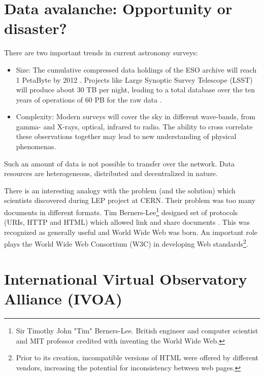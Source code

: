 \section{ Data avalanche: Opportunity or disaster?}

There are two important trends in current astronomy surveys:

\begin{itemize}

  \item{Size:} The cumulative compressed data holdings of the ESO archive will
    reach 1 PetaByte by 2012 \citep{hanisch2010international}. Projects
    like Large Synoptic Survey Telescope (LSST) will produce about 30
    TB per night, leading to a total database over the ten years of
    operations of 60 PB for the raw data \citep{becla2006designing}.
   
  \item{Complexity:} Modern surveys will cover the sky in different
    wave-bands, from gamma- and X-rays, optical, infrared to
    radio. The ability to cross correlate these observations together
    may lead to new understanding of physical
    phenomenas. \citep{hanisch2010international}
\end{itemize}



Such an amount of data is not possible to transfer over the
network. Data resources are heterogeneous, distributed and
decentralized in nature.


There is an interesting analogy with the problem (and the solution)
which scientists discovered during LEP project at CERN.  Their problem
was too many documents in different formats. Tim Berners-Lee\footnote{
  Sir Timothy John "Tim" Berners-Lee. British engineer and computer
  scientist and MIT professor credited with inventing the World Wide
  Web.} designed set of protocols (URIs, HTTP and HTML) which allowed
link and share documents \citep{berners1990worldwideweb}. This was
recognized as generally useful and World Wide Web was born. An
important role plays the World Wide Web Consortium (W3C) in developing
Web standards\footnote{Prior to its creation, incompatible versions of
  HTML were offered by different vendors, increasing the potential for
  inconsistency between web pages.}.
    
    
\section{International Virtual Observatory Alliance (IVOA)}

